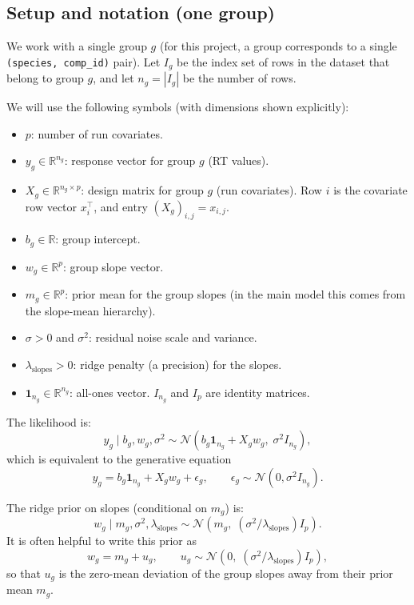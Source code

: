 \documentclass[11pt]{article}
\begin{document}
\subsection{Setup and notation (one group)}

We work with a single group $g$ (for this project, a group corresponds to a single \texttt{(species, comp\_id)} pair).
Let $I_g$ be the index set of rows in the dataset that belong to group $g$, and let $n_g = |I_g|$ be the number of rows.

We will use the following symbols (with dimensions shown explicitly):
\begin{itemize}
  \item $p$: number of run covariates.
  \item $y_g\in\mathbb{R}^{n_g}$: response vector for group $g$ (RT values).
  \item $X_g\in\mathbb{R}^{n_g\times p}$: design matrix for group $g$ (run covariates). Row $i$ is the covariate row
  vector $x_i^\top$, and entry $(X_g)_{i,j}=x_{i,j}$.
  \item $b_g\in\mathbb{R}$: group intercept.
  \item $w_g\in\mathbb{R}^{p}$: group slope vector.
  \item $m_g\in\mathbb{R}^{p}$: prior mean for the group slopes (in the main model this comes from the slope-mean
  hierarchy).
  \item $\sigma>0$ and $\sigma^2$: residual noise scale and variance.
  \item $\lambda_{\mathrm{slopes}}>0$: ridge penalty (a precision) for the slopes.
  \item $\mathbf{1}_{n_g}\in\mathbb{R}^{n_g}$: all-ones vector. $I_{n_g}$ and $I_p$ are identity matrices.
\end{itemize}

The likelihood is:
\[
  y_g \mid b_g,w_g,\sigma^2 \sim \mathcal{N}\!\left(b_g \mathbf{1}_{n_g} + X_g w_g,\; \sigma^2 I_{n_g}\right),
\]
which is equivalent to the generative equation
\[
  y_g = b_g \mathbf{1}_{n_g} + X_g w_g + \epsilon_g,\qquad \epsilon_g \sim \mathcal{N}(0,\sigma^2 I_{n_g}).
\]

The ridge prior on slopes (conditional on $m_g$) is:
\[
  w_g \mid m_g,\sigma^2,\lambda_{\mathrm{slopes}} \sim
  \mathcal{N}\!\left(m_g,\; (\sigma^2/\lambda_{\mathrm{slopes}}) I_p\right).
\]
It is often helpful to write this prior as
\[
  w_g = m_g + u_g,\qquad u_g \sim \mathcal{N}\!\left(0,\; (\sigma^2/\lambda_{\mathrm{slopes}}) I_p\right),
\]
so that $u_g$ is the zero-mean deviation of the group slopes away from their prior mean $m_g$.
\end{document}
